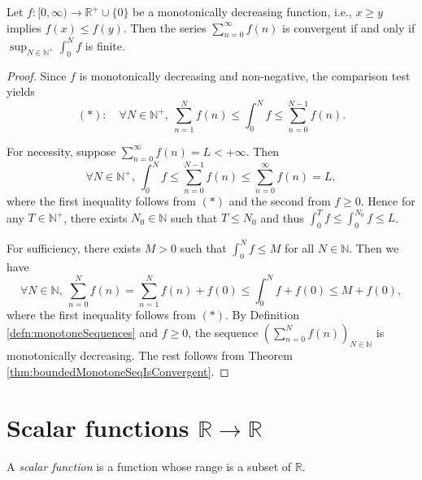 \begin{thm}
  \label{thm:integralTest}
  Let $f:[0, \infty)\rightarrow \mathbb{R}^+\cup\{0\}$
   be a monotonically decreasing function,
   i.e., $x\ge y$ implies $f(x)\le f(y)$.
  Then the series $\sum_{n=0}^{\infty}f(n)$ is convergent if and only if
   $\sup_{N\in\mathbb{N}^+}\int_0^N f$ is finite.
\end{thm}
\begin{proof}
  Since $f$ is monotonically decreasing and non-negative,
  the comparison test yields
  \begin{displaymath}
    (*):\quad
    \forall N\in \mathbb{N}^{+},\ 
    \sum_{n=1}^{N}f(n)\le \int_{0}^{N}f \le \sum_{n=0}^{N-1}f(n).
  \end{displaymath}
  
  For necessity, suppose $\sum_{n=0}^{\infty}f(n)=L<+\infty$.
  Then 
  \begin{displaymath}
    \forall N\in \mathbb{N}^+,\ 
    \int_{0}^{N}f\le\sum_{n=0}^{N-1}f(n)\le\sum_{n=0}^{\infty}f(n)=L,
  \end{displaymath}
  where the first inequality follows from $(*)$
  and the second from $f\ge 0$. 
  Hence for any $T\in\mathbb{N}^+$, there exists $N_{0}\in \mathbb{N}$ such that
  $T\le N_{0}$ and thus $\int_{0}^{T}f\le \int_{0}^{N_{0}}f\le L$.

  For sufficiency, there exists $M>0$ such that
  $\int_{0}^{N}f\le M$ for all $N\in \mathbb{N}$.
  Then we have
  \begin{displaymath}
    \forall N\in \mathbb{N},\ 
    \sum_{n=0}^{N}f(n)=\sum_{n=1}^{N}f(n)+f(0)
    \le \int_{0}^{N}f+f(0)
    \le M+f(0),
  \end{displaymath}
  where the first inequality follows from $(*)$.
  By Definition \ref{defn:monotoneSequences}
  and $f\ge 0$, 
  the sequence $(\sum_{n=0}^{N}f(n))_{N\in \mathbb{N}}$
  is monotonically decreasing.
  The rest follows from
  Theorem \ref{thm:boundedMonotoneSeqIsConvergent}.
\end{proof}

\section{Scalar functions
  $\mathbb{R}\rightarrow\mathbb{R}$}
\label{sec:cont-funct-on-R}

\begin{defn}
  A \emph{scalar function} is a function
   whose range is a subset of $\mathbb{R}$.
\end{defn}

